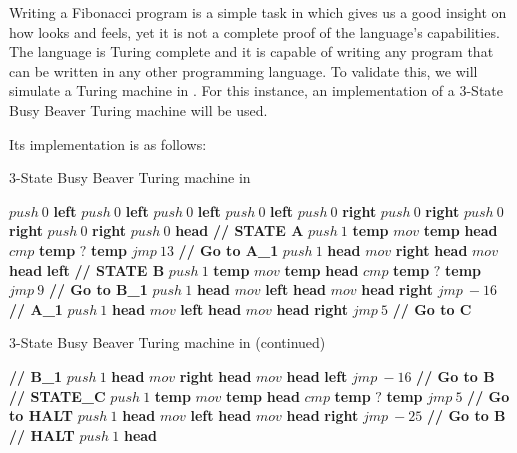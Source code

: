 Writing a Fibonacci program is a simple task in \sculpt which gives us a good insight on how \sculpt looks and feels, yet it is not a complete proof of the language's capabilities.
The language is Turing complete and it is capable of writing any program that can be written in any other programming language.
To validate this, we will simulate a Turing machine in \sculpt.
For this instance, an implementation of a 3-State Busy Beaver Turing machine will be used.

Its \sculpter implementation is as follows:

\begin{algorithm}[H]
    \caption{3-State Busy Beaver Turing machine in \sculpt}
    \label{alg:busybeaver}
    \small
    \begin{algorithmic}
    \State $push~0$ \textbf{left}
    \State $push~0$ \textbf{left}
    \State $push~0$ \textbf{left}
    \State $push~0$ \textbf{left}
    \State $push~0$ \textbf{right}
    \State $push~0$ \textbf{right}
    \State $push~0$ \textbf{right}
    \State $push~0$ \textbf{right}
    \State $push~0$ \textbf{head}
    \State \textbf{// STATE A}
    \State $push~1$ \textbf{temp}
    \State $mov$ \textbf{temp} \textbf{head}
    \State $cmp$ \textbf{temp}
    \State $?$ \textbf{temp}
    \State $jmp~13$ \textbf{// Go to A\_1}
    \State $push~1$ \textbf{head}
    \State $mov$ \textbf{right} \textbf{head}
    \State $mov$ \textbf{head} \textbf{left}
    \State \textbf{// STATE B}
    \State $push~1$ \textbf{temp}
    \State $mov$ \textbf{temp} \textbf{head}
    \State $cmp$ \textbf{temp}
    \State $?$ \textbf{temp}
    \State $jmp~9$ \textbf{// Go to B\_1}
    \State $push~1$ \textbf{head}
    \State $mov$ \textbf{left} \textbf{head}
    \State $mov$ \textbf{head} \textbf{right}
    \State $jmp~-16$ 
    \State \textbf{// A\_1}
    \State $push~1$ \textbf{head}
    \State $mov$ \textbf{left} \textbf{head}
    \State $mov$ \textbf{head} \textbf{right}
    \State $jmp~5$ \textbf{// Go to C}
    \end{algorithmic}
\end{algorithm}

\begin{algorithm}[H]
    \caption{3-State Busy Beaver Turing machine in \sculpt (continued)}
    \label{alg:busybeaver}
    \small
    \begin{algorithmic}
    \State \textbf{// B\_1}
    \State $push~1$ \textbf{head}
    \State $mov$ \textbf{right} \textbf{head}
    \State $mov$ \textbf{head} \textbf{left}
    \State $jmp~-16$ \textbf{// Go to B}
    \State \textbf{// STATE\_C}
    \State $push~1$ \textbf{temp}
    \State $mov$ \textbf{temp} \textbf{head}
    \State $cmp$ \textbf{temp}
    \State $?$ \textbf{temp}
    \State $jmp~5$ \textbf{// Go to HALT}
    \State $push~1$ \textbf{head}
    \State $mov$ \textbf{left} \textbf{head}
    \State $mov$ \textbf{head} \textbf{right}
    \State $jmp~-25$ \textbf{// Go to B}
    \State \textbf{// HALT}
    \State $push~1$ \textbf{head}
    \end{algorithmic}
\end{algorithm}

